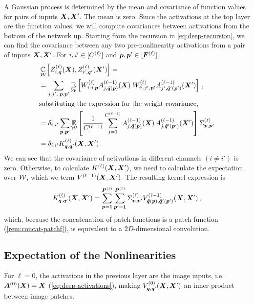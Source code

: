 \documentclass[accepted]{uai2021} %
\newcommand{\layerAsd}[2]{Z^{(#1)}_{#2}(\vX')}
\newcommand{\layerAs}[2]{Z^{(#1)}_{#2}(\vX)}
\newcommand{\layerC}[1]{C^{(#1)}}
\newcommand{\layerNLAsd}[2]{A^{(#1)}_{#2}(\vX')}
\newcommand{\layerNLAs}[2]{A^{(#1)}_{#2}(\vX)}
\newcommand{\layerNLA}[2]{\vA^{(#1)}_{#2}(\vX)}
\newcommand{\layerWs}[1]{W^{(#1)}}
\newcommand{\layersizebase}{\vF}
\newcommand{\layersize}[1]{{\layersizebase^{\bra{#1}}}}
\newcommand{\patchsizebase}{\vP}
\newcommand{\patchsize}[1]{{\patchsizebase^{\bra{#1}}}}
\newcommand{\patchf}[2]{{\tilde#1\bra{#2}}}
\newcommand{\priorWcovs}[1]{\Sigma^{(#1)}}
\newcommand{\chan}{i}
\newcommand{\prevchan}{j}   %
\newcommand{\patch}{\vp}               %
\newcommand{\nextpatch}{\vq}
\newcommand{\covf}[1]{K\ssup{#1}}
\newcommand{\nlinf}[1]{V\ssup{#1}}
\newcommand{\0}{\boldsymbol{0}}
\newcommand{\1}{\boldsymbol{1}}
\newcommand{\crefp}[1]{(\cref{#1})}
\begin{document}
A Gaussian process is determined by the mean and covariance of function values for pairs of inputs ${\bm{X}},{\bm{X}}'$. The mean is zero. Since the activations at the top layer are the function values, we will compute covariances between activations from the bottom of the network up.
Starting from the recursion in \cref{eq:deep-recursion}, we can find the covariance between any two pre-nonlinearity activations from a pair of inputs ${\bm{X}},{\bm{X}}'$. For $\chan,\chan'\in\countto{\layerC{\ell}}$ and $\patch,\patch'\in\countto{\layersize{\ell}}$,
\begin{align}
  &\Cov_{\gW}\left[\layerAs{\ell}{\chan,\nextpatch},\layerAsd{\ell}{\chan',\nextpatch'}\right] = \nonumber\\
  &=\sum_{\prevchan,\prevchan',\;\patch,\patch'} \Expect{\gW}{
    \layerWs{\ell}_{\chan,\prevchan,\patch}\layerNLAs{\ell-1}{\prevchan,\patchf{\nextpatch}{\patch}}\; \layerWs{\ell}_{\chan',\prevchan',\patch'}\layerNLAsd{\ell-1}{\prevchan',\patchf{\nextpatch'}{\patch'}}}\,, \nonumber \\
  \intertext{substituting the expression for the weight covariance,}
  &= \delta_{\chan,\chan'} \sum_{\patch,\patch'}
    \Expect{\gW}{\frac{1}{\layerC{\ell-1}}\sum_{\prevchan=1}^{\layerC{\ell-1}}
    \layerNLAs{\ell-1}{\prevchan,\patchf{\nextpatch}{\patch}}\,
    \layerNLAsd{\ell-1}{\prevchan,\patchf{\nextpatch'}{\patch'}}
    } \priorWcovs{\ell}_{\patch,\patch'} \nonumber \\
  &= \delta_{\chan,\chan'} \covf{\ell}_{\nextpatch,\nextpatch'}\bra{\mX,\mX'}\,.\label{eq:kernel-recursion}
\end{align}
We can see that the covariance of activations in different channels
$(\chan\ne\chan')$ is zero. Otherwise, to calculate
$\covf{\ell}\bra{\mX,\mX'}$, we need to calculate the
expectation over ${\mathcal{W}}$, which we term $\nlinf{\ell-1}\bra{\mX,\mX'}.$ The resulting kernel expression is
\begin{equation}
  \covf{\ell}_{\nextpatch,\nextpatch'}\bra{\mX,\mX'} = \sum_{\patch=\1}^{{\patchsize{\ell}}}
  \sum_{\patch'=\1}^{{\patchsize{\ell}}} \priorWcovs{\ell}_{\patch,\patch'}
  \nlinf{\ell-1}_{\patchf{\nextpatch}{\patch},\patchf{\nextpatch'}{\patch'}}\bra{\mX,\mX'}\,,
  \label{eq:cnn-kernel-recursive}
\end{equation}
which, because the concatenation of patch functions is a patch function \crefp{rem:concat-patchf}, is equivalent to a $2D$-dimensional convolution.

\subsection{Expectation of the Nonlinearities}
\label{sec:exp-nonlin}
For $\ell=0$, the activations in the previous layer are the image inputs, i.e.~$\layerNLA{0}{} = \vX$ (\cref{eq:deep-activations}), making $\nlinf{0}_{\nextpatch,\nextpatch'}\bra{\mX,\mX'}$ an inner product between image patches.
\end{document}
